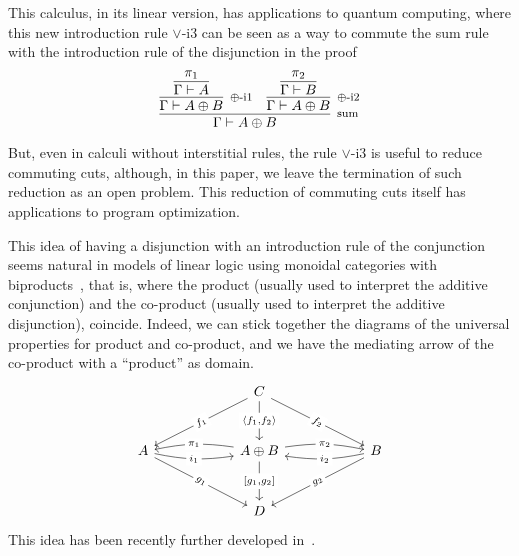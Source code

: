 \documentclass[screen, sigconf,authorversion,nonacm]{acmart}
\theoremstyle{acmdefinition}
\numberwithin{equation}{section}
\newcommand\irule[3]{\infer[\mbox{\footnotesize $#3$}]{#2}{#1}}
\newcommand\pair[2]{\langle #1, #2 \rangle}
\begin{document}
This calculus, in its linear version, has applications to quantum
computing, where this new introduction rule $\vee$-i3 can be seen as a
way to commute the sum rule with the introduction rule of the
disjunction in the proof
$$\irule{\irule{\irule{\pi_1}
                      {\Gamma \vdash A}
                      {}
                }
                {\Gamma \vdash A \oplus B}
                {\mbox{$\oplus$-i1}}
        &\irule{\irule{\pi_2}
                      {\Gamma \vdash B}
                      {}
               }
               {\Gamma \vdash A \oplus B}
               {\mbox{$\oplus$-i2}}
        }
        {\Gamma \vdash A \oplus B}
        {\mbox{sum}}$$

But, even in calculi without interstitial rules, the rule $\vee$-i3 is
useful to reduce commuting cuts, although, in this paper, we leave the
termination of such reduction as an open problem. This reduction of
commuting cuts itself has applications to program optimization.

This idea of having a disjunction with an introduction rule of the
conjunction seems natural in models of linear logic using monoidal
categories with biproducts~\cite{BarrMSCS91}, that is, where the
product (usually used to interpret the additive conjunction) and the
co-product (usually used to interpret the additive disjunction),
coincide. Indeed, we can stick together the diagrams of the universal
properties for product and co-product, and we have the mediating arrow
of the co-product with a ``product'' as domain.
\[
  \begin{tikzcd}[column sep=2cm,labels=description,row sep=1cm]
    &  C\ar[d,"{\pair {f_1}{f_2}}"]\ar[dl,"{f_1}",sloped]\ar[dr,"{f_2}",sloped] \\
     A\ar[dr,"{g_1}"',sloped]\ar[r,"{i_1}"',bend right=10] & {A\oplus B}\ar[d,"{[g_1,g_2]}"]\ar[r,"{\pi_2}",bend left=10]\ar[l,"{\pi_1}"',bend right=10] &  B\ar[l,"{i_2}",bend left=10]\ar[dl,"{g_2}"',sloped]\\
    &  D
  \end{tikzcd}
\] 
This idea has been recently further developed
in~\cite{DiazcaroMalherbeArxiv23}.
\end{document}
